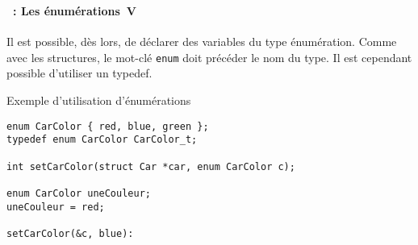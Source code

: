 \begin{frame}[containsverbatim]
  \frametitle{\secname}
  \framesubtitle{\subsecname~: Les énumérations~V} 

  Il est possible, dès lors, de déclarer des variables du type énumération. Comme avec les structures, le mot-clé
  \verb|enum| doit précéder le nom du type. Il est cependant possible d'utiliser un typedef.
  \vspace{0.3cm}
  \begin{exampleblock}{Exemple d'utilisation d'énumérations}
    \begin{verbatim}
enum CarColor { red, blue, green };
typedef enum CarColor CarColor_t;

int setCarColor(struct Car *car, enum CarColor c);

enum CarColor uneCouleur;
uneCouleur = red;

setCarColor(&c, blue):\end{verbatim}
  \end{exampleblock}
\end{frame}

